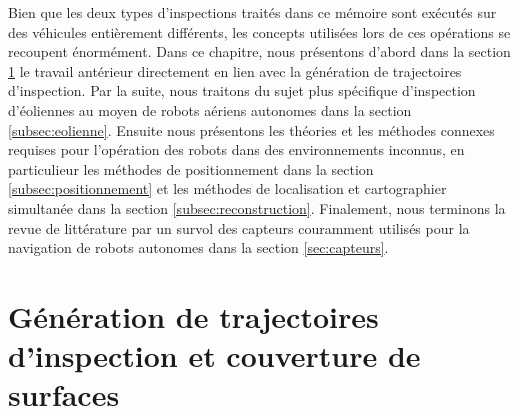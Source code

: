 \label{sec:RevLitt}
%

Bien que les deux types d'inspections traités dans ce mémoire sont exécutés sur des véhicules entièrement différents, les concepts utilisées lors de ces opérations se recoupent énormément. Dans ce chapitre, nous présentons d'abord dans la section \ref{subsec:generation} le travail antérieur directement en lien avec la génération de trajectoires d'inspection. Par la suite, nous traitons du sujet plus spécifique d'inspection d'éoliennes au moyen de robots aériens autonomes dans la section \ref{subsec:eolienne}. Ensuite nous présentons les théories et les méthodes connexes requises pour l'opération des robots dans des environnements inconnus, en particulieur les méthodes de positionnement dans la section \ref{subsec:positionnement} et les méthodes de localisation et cartographier simultanée dans la section \ref{subsec:reconstruction}. Finalement, nous terminons la revue de littérature par un survol des capteurs couramment utilisés pour la navigation de robots autonomes dans la section \ref{sec:capteurs}.

\section{Génération de trajectoires d'inspection et couverture de surfaces}\label{subsec:generation}

